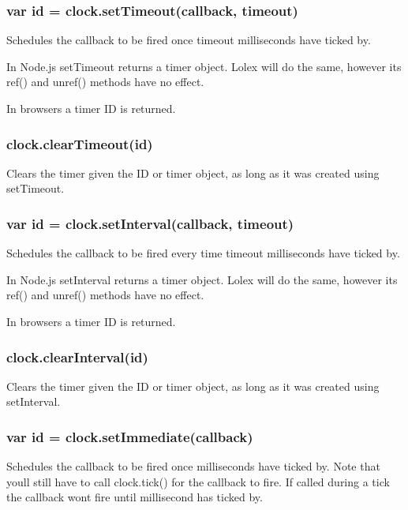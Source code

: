 \subsubsection*{{\ttfamily var id = clock.\+set\+Timeout(callback, timeout)}}

Schedules the callback to be fired once {\ttfamily timeout} milliseconds have ticked by.

In Node.\+js {\ttfamily set\+Timeout} returns a timer object. Lolex will do the same, however its {\ttfamily ref()} and {\ttfamily unref()} methods have no effect.

In browsers a timer ID is returned.

\subsubsection*{{\ttfamily clock.\+clear\+Timeout(id)}}

Clears the timer given the ID or timer object, as long as it was created using {\ttfamily set\+Timeout}.

\subsubsection*{{\ttfamily var id = clock.\+set\+Interval(callback, timeout)}}

Schedules the callback to be fired every time {\ttfamily timeout} milliseconds have ticked by.

In Node.\+js {\ttfamily set\+Interval} returns a timer object. Lolex will do the same, however its {\ttfamily ref()} and {\ttfamily unref()} methods have no effect.

In browsers a timer ID is returned.

\subsubsection*{{\ttfamily clock.\+clear\+Interval(id)}}

Clears the timer given the ID or timer object, as long as it was created using {\ttfamily set\+Interval}.

\subsubsection*{{\ttfamily var id = clock.\+set\+Immediate(callback)}}

Schedules the callback to be fired once {} milliseconds have ticked by. Note that you\textquotesingle{}ll still have to call {\ttfamily clock.\+tick()} for the callback to fire. If called during a tick the callback won\textquotesingle{}t fire until {} millisecond has ticked by.

